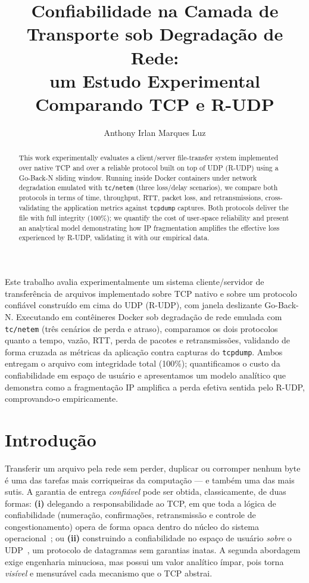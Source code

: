 \documentclass[12pt]{article}
\title{Confiabilidade na Camada de Transporte sob Degradação de Rede:\\
um Estudo Experimental Comparando TCP e R-UDP}
\author{Anthony Irlan Marques Luz\inst{1}}
\begin{document}
\maketitle

\begin{abstract}
  This work experimentally evaluates a client/server file-transfer system implemented
  over native TCP and over a reliable protocol built on top of UDP (R-UDP) using a
  Go-Back-N sliding window. Running inside Docker containers under network degradation
  emulated with \texttt{tc/netem} (three loss/delay scenarios), we compare both protocols
  in terms of time, throughput, RTT, packet loss, and retransmissions, cross-validating
  the application metrics against \texttt{tcpdump} captures. Both protocols deliver the
  file with full integrity (100\%); we quantify the cost of user-space reliability and
  present an analytical model demonstrating how IP fragmentation amplifies the effective 
  loss experienced by R-UDP, validating it with our empirical data.
\end{abstract}

\begin{resumo}
  Este trabalho avalia experimentalmente um sistema cliente/servidor de transferência de
  arquivos implementado sobre TCP nativo e sobre um protocolo confiável construído em cima
  do UDP (R-UDP), com janela deslizante Go-Back-N. Executando em contêineres Docker sob
  degradação de rede emulada com \texttt{tc/netem} (três cenários de perda e atraso),
  comparamos os dois protocolos quanto a tempo, vazão, RTT, perda de pacotes e
  retransmissões, validando de forma cruzada as métricas da aplicação contra capturas do
  \texttt{tcpdump}. Ambos entregam o arquivo com integridade total (100\%); quantificamos
  o custo da confiabilidade em espaço de usuário e apresentamos um modelo analítico que 
  demonstra como a fragmentação IP amplifica a perda efetiva sentida pelo R-UDP, 
  comprovando-o empiricamente.
\end{resumo}

\section{Introdução}

Transferir um arquivo pela rede sem perder, duplicar ou corromper nenhum byte é uma das
tarefas mais corriqueiras da computação --- e também uma das mais sutis. A garantia de
entrega \emph{confiável} pode ser obtida, classicamente, de duas formas: \textbf{(i)} delegando
a responsabilidade ao TCP, em que toda a lógica de confiabilidade (numeração, confirmações, 
retransmissão e controle de congestionamento) opera de forma opaca dentro do núcleo do sistema 
operacional~\cite{rfc793}; ou \textbf{(ii)} construindo a confiabilidade no espaço de usuário 
\emph{sobre} o UDP~\cite{rfc768}, um protocolo de datagramas sem garantias inatas. A segunda 
abordagem exige engenharia minuciosa, mas possui um valor analítico ímpar, pois torna \emph{visível} 
e mensurável cada mecanismo que o TCP abstrai.
\end{document}
